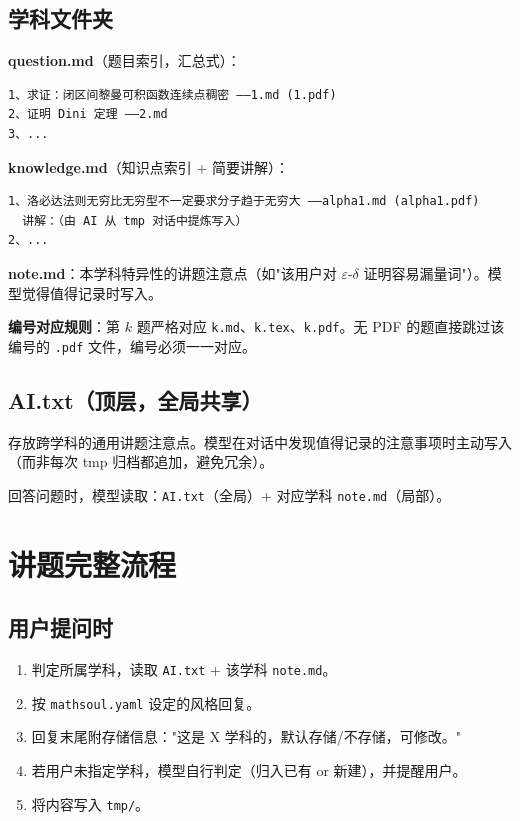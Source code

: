 \documentclass[12pt,a4paper]{ctexart}
\begin{document}
\subsection{学科文件夹}

\textbf{question.md}（题目索引，汇总式）：
\begin{lstlisting}
1、求证：闭区间黎曼可积函数连续点稠密 ——1.md (1.pdf)
2、证明 Dini 定理 ——2.md
3、...
\end{lstlisting}

\textbf{knowledge.md}（知识点索引 + 简要讲解）：
\begin{lstlisting}
1、洛必达法则无穷比无穷型不一定要求分子趋于无穷大 ——alpha1.md (alpha1.pdf)
  讲解：（由 AI 从 tmp 对话中提炼写入）
2、...
\end{lstlisting}

\textbf{note.md}：本学科特异性的讲题注意点（如"该用户对 $\varepsilon$-$\delta$ 证明容易漏量词"）。模型觉得值得记录时写入。

\textbf{编号对应规则}：第 $k$ 题严格对应 \texttt{k.md}、\texttt{k.tex}、\texttt{k.pdf}。无 PDF 的题直接跳过该编号的 \texttt{.pdf} 文件，编号必须一一对应。

\subsection{AI.txt（顶层，全局共享）}

存放跨学科的通用讲题注意点。模型在对话中发现值得记录的注意事项时主动写入（而非每次 tmp 归档都追加，避免冗余）。

回答问题时，模型读取：\texttt{AI.txt}（全局）+ 对应学科 \texttt{note.md}（局部）。

\section{讲题完整流程}

\subsection{用户提问时}

\begin{enumerate}
  \item 判定所属学科，读取 \texttt{AI.txt} + 该学科 \texttt{note.md}。
  \item 按 \texttt{mathsoul.yaml} 设定的风格回复。
  \item 回复末尾附存储信息："这是 X 学科的，默认存储/不存储，可修改。"
  \item 若用户未指定学科，模型自行判定（归入已有 or 新建），并提醒用户。
  \item 将内容写入 \texttt{tmp/}。
\end{enumerate}
\end{document}
